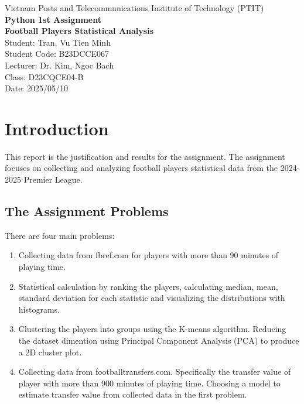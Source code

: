 \documentclass{report}
\begin{document}

\begin{center}
    Vietnam Posts and Telecommunications Institute of Technology (PTIT) \\
    \vspace{0.5cm}
    \Large\textbf{Python 1st Assignment \\ Football Players Statistical Analysis} \\
    \vspace{0.5cm}
    \normalsize 
    Student: Tran, Vu Tien Minh \\
    Student Code: B23DCCE067 \\
    Lecturer: Dr. Kim, Ngoc Bach \\
    Class: D23CQCE04-B \\
    Date: 2025/05/10
\end{center}

\section{Introduction}
This report is the justification and results for the assignment. 
The assignment focuses on collecting and analyzing football players statistical data from 
the 2024-2025 Premier League.

\subsection{The Assignment Problems}
There are four main problems:
\begin{enumerate}
    \renewcommand{\labelenumi}{\Roman{enumi}.}
    \item Collecting data from fbref.com for players with more than 90 minutes of 
    playing time.
    \item Statistical calculation by ranking the players, calculating median, mean, standard 
    deviation for each statistic and visualizing the distributions with histograms.
    \item Clustering the players into groups using the K-means algorithm. 
    Reducing the dataset dimention using Principal Component Analysis (PCA) to produce a 2D 
    cluster plot. 
    \item Collecting data from footballtransfers.com. Specifically the transfer value of player 
    with more than 900 minutes of playing time. 
    Choosing a model to estimate transfer value from collected data in the first problem.
\end{enumerate}
\end{document}
